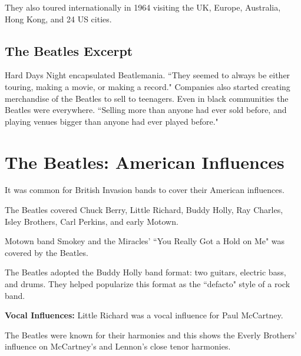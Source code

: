 \documentclass[12pt, a4paper, twoside, openright, titlepage]{book}
\begin{document}
\begin{rmk}{}{}
    They also toured internationally in 1964 visiting the UK, Europe, Australia, Hong Kong, and 24 US cities.
\end{rmk}

\subsection{The Beatles Excerpt}

Hard Days Night encapsulated Beatlemania. ``They seemed to always be either touring, making a movie, or making a record." Companies also started creating merchandise of the Beatles to sell to teenagers. Even in black communities the Beatles were everywhere. ``Selling more than anyone had ever sold before, and playing venues bigger than anyone had ever played before."

\section{The Beatles: American Influences}

\begin{rmk}{}{}
    It was common for British Invasion bands to cover their American influences.
\end{rmk}

\begin{eg}{}{}
    The Beatles covered Chuck Berry, Little Richard, Buddy Holly, Ray Charles, Isley Brothers, Carl Perkins, and early Motown.
\end{eg}

\begin{eg}{}{}
    Motown band Smokey and the Miracles' ``You Really Got a Hold on Me" was covered by the Beatles.
\end{eg}

\begin{note}{}{}
    The Beatles adopted the Buddy Holly band format: two guitars, electric bass, and drums. They helped popularize this format as the ``defacto" style of a rock band.
\end{note}

\textbf{Vocal Influences:} Little Richard was a vocal influence for Paul McCartney.

\begin{note}{}{}
    The Beatles were known for their harmonies and this shows the Everly Brothers' influence on McCartney's and Lennon's close tenor harmonies.
\end{note}
\end{document}
